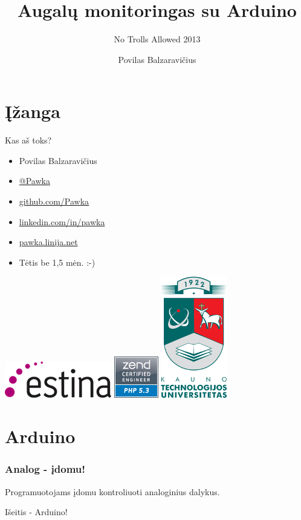 \documentclass[12pt,a4paper]{beamer}
\author{Povilas Balzaravičius}
\title{Augalų monitoringas su Arduino}
\subtitle{No Trolls Allowed 2013}
\begin{document}
\section{Įžanga}
\begin{frame}
	\titlepage
\end{frame}

\begin{frame}{Kas aš toks?}
    \begin{itemize}
        \item Povilas Balzaravičius
        \item \href{https://twitter.com/Pawka}{@Pawka}
        \item \href{https://github.com/Pawka}{github.com/Pawka}
        \item \href{https://linkedin.com/in/pawka}{linkedin.com/in/pawka}
        \item \href{http://pawka.linija.net}{pawka.linija.net}
        \item Tėtis be 1,5 mėn. :-)
    \end{itemize}
    \begin{center}
        \includegraphics[scale=0.4]{img/estina.png}
        \hskip1.5cm
        \includegraphics[scale=0.4]{img/zce.png}
        \hskip1.5cm
        \includegraphics[scale=0.75]{img/ktu.png}
    \end{center}
\end{frame}

\section{Arduino}
\begin{frame}
    \frametitle{Analog - įdomu!}

    \begin{center}
        Programuotojams įdomu kontroliuoti analoginius dalykus.
    \end{center}
    \pause
    \begin{center}
        {\Huge Išeitis - Arduino!}
    \end{center}

\end{frame}
\end{document}
